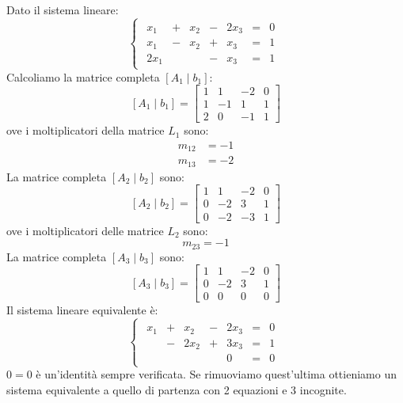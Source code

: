 \documentclass[12pt]{report}
\begin{document}
\begin{example}{}{}
Dato il sistema lineare:
\[
\begin{cases}
	\begin{array}{rcrcrcr}
	x_1 & + & x_2 & - & 2x_3 & = & 0 \\
	x_1 & - & x_2 & + & x_3 & = & 1 \\
	2x_1 & & & - & x_3 & = & 1
	\end{array}
\end{cases}
\]
Calcoliamo la matrice completa $[A_1 \mid b_1]$:
\[
[A_1 \mid b_1] = \left[
	\begin{array}{rrr|c}
	1 & 1 & - 2 & 0 \\
	1 & -1 & 1 & 1 \\
	2 & 0 & -1 & 1
	\end{array}
\right]
\]
ove i moltiplicatori della matrice $L_1$ sono:
\begin{align*}
	m_{12} &= -1 \\
	m_{13} &= -2
\end{align*}
La matrice completa $[A_2 \mid b_2]$ sono:
\[
[A_2 \mid b_2] = \left[
\begin{array}{rrr|c}
1 & 1 & -2 & 0 \\
0 & -2 & 3 & 1 \\
0 & -2 & -3 & 1
\end{array}
\right]
\]
ove i moltiplicatori delle matrice $L_2$ sono:
\[
m_{23} = -1
\]
La matrice completa $[A_3 \mid b_3]$ sono:
\[
[A_3 \mid b_3] = \left[
\begin{array}{rrr|c}
1 & 1 & -2 & 0 \\
0 & -2 & 3 & 1 \\
0 & 0 & 0 & 0
\end{array}
\right]
\]
Il sistema lineare equivalente è:
\[
\begin{cases}
	\begin{array}{rcrcrcr}
	x_1 & + & x_2 & - & 2x_3 & = & 0 \\
	& - & 2x_2 & + & 3x_3 & = & 1 \\
	& & & & 0 & = & 0
	\end{array}
\end{cases}
\]
$0=0$ è un'identità sempre verificata. Se rimuoviamo quest'ultima ottieniamo un sistema equivalente a quello di partenza con 2 equazioni e 3 incognite.


\end{example}
\end{document}

